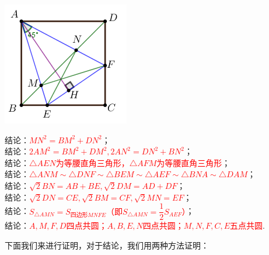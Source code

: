\documentclass[10pt]{ctexart}
\begin{document}
\vspace{2em}
\begin{minipage}{0.25\textwidth}
	\includegraphics[scale=0.8]{figure/banjiao07.png}
\end{minipage}
\begin{minipage}{0.75\textwidth}
结论：\textcolor{red}{$MN^2=BM^2+DN^2$}；\\
结论：\textcolor{red}{$2AM^2=BM^2+DM^2,2AN^2=DN^2+BN^2$}；\\
结论：\textcolor{red}{$\triangle AEN$为等腰直角三角形，$\triangle AFM$为等腰直角三角形}；\\
结论：\textcolor{red}{$\triangle ANM \sim \triangle DNF \sim \triangle BEM \sim \triangle AEF \sim \triangle BNA \sim \triangle DAM$}；\\
结论：\textcolor{red}{$\sqrt{2}BN=AB+BE,\sqrt{2}DM=AD+DF$}；\\
结论：\textcolor{red}{$\sqrt{2}DN=CE,\sqrt{2}BM=CF,\sqrt{2}MN=EF$}；\\
结论：\textcolor{red}{$S_{\triangle AMN}=S_{\text{四边形}MNFE}$（即$S_{\triangle AMN}=\dfrac{1}{2}S_{AEF}$）}；\\
结论：\textcolor{red}{$A,M,F,D$四点共圆；$A,B,E,N$四点共圆；$M,N,F,C,E$五点共圆}.
\end{minipage}
\vspace{2em}

下面我们来进行证明，对于结论，我们用两种方法证明：
\end{document}
